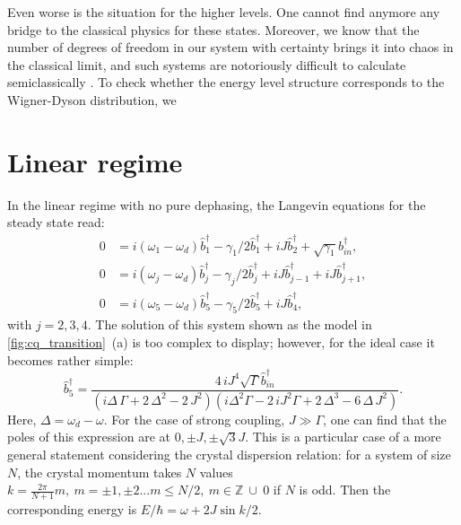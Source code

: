 \documentclass[%
 aps, pra,
 amsmath,amssymb,
 reprint,%
superscriptaddress
]{revtex4-2}
\begin{document}
Even worse is the situation for the higher levels. One cannot find anymore any bridge to the classical physics for these states. Moreover, we know that the number of degrees of freedom in our system with certainty brings it into chaos in the classical limit, and such systems are notoriously difficult to calculate semiclassically \cite{wintgen1992semiclassical}. To check whether the energy level structure corresponds to the Wigner-Dyson distribution, we 

\appendix

\section{Linear regime} \label{sec:app_linear}

In the linear regime with no pure dephasing, the Langevin equations for the steady state read:
\begin{equation}
\begin{aligned}
0 &= i(\omega_1 - \omega_d)\hat b_1^\dag - \gamma_1/2 \hat b_1^\dag + i J\hat b_2^\dag + \sqrt{\gamma_1}b_{in}^\dag,\\
0 &= i(\omega_j - \omega_d)\hat b_j^\dag - \gamma_j/2 \hat b_{j}^\dag + i J\hat b_{j-1}^\dag + i J\hat b_{j+1}^\dag,\\
0 &= i(\omega_5 - \omega_d)\hat b_5^\dag - \gamma_5/2 \hat b_5^\dag + i J\hat b_4^\dag,
\end{aligned} 
\end{equation}
with $j = 2,3,4$. The solution of this system shown as the model in \autoref{fig:cq_transition}~(a) is too complex to display; however, for the ideal case it becomes rather simple:
\begin{equation}
\hat b_{{5}}^\dag={\frac {4\,i{J}^{4}\sqrt {\Gamma} \hat b_{in}^\dag}{ \left( i\Delta\,
\Gamma+2\,{\Delta}^{2}-2\,{J}^{2} \right)  \left( i{\Delta}^{2}
\Gamma-2\,i{J}^{2}\Gamma+2\,{\Delta}^{3}-6\,\Delta\,{J}^{2
} \right) }}.
\end{equation}
Here, $\Delta = \omega_d - \omega$. For the case of strong coupling, $J\gg \Gamma$, one can find that the poles of this expression are at $0, \pm J, \pm \sqrt 3 J $. This is a particular case of a more general statement considering the crystal dispersion relation: for a system of size $N$, the crystal momentum takes $N$ values $k = \frac{2 \pi}{N+1} m,\ m=\pm 1, \pm 2... m \leq N/2,\ m\in \mathbb{Z}\  \cup\ {0}$ if $ N $ is odd. Then the corresponding energy is $E/\hbar = \omega + 2 J \sin k/2$.
\end{document}
